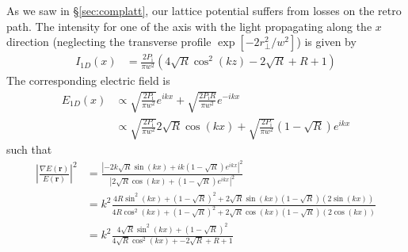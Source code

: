\documentclass[11pt,letter]{article}
\newcommand{\bv}[1]{\ensuremath{\bm{#1}}}
\begin{document}
\vspace{1em} As we saw in \S\ref{sec:complatt}, our lattice potential suffers
from losses on the retro path.  The intensity for one of the axis with the
light propagating along the $x$ direction (neglecting the transverse profile
$\exp[-2r_{\perp}^{2}/w^{2}]$) is given by 
\begin{equation}
\begin{split}
 I_{1D}(x) 
   & = 
\frac{2 P_{\text{i}}}{\pi w^{2}} 
  \left( 4\sqrt{R}\cos^{2}(kz) - 2\sqrt{R} +R+1\right)
\end{split}
\label{eq:I1D} 
\end{equation}
The corresponding electric field is 
\begin{equation}
\begin{split}
 E_{1D}(x) & \propto  \sqrt{\frac{2P_{\text{i}} }{\pi w^{2}}}
  e^{ikx} + \sqrt{ \frac{2P_{\text{i}}R }{ \pi w^{2} } } e^{-ikx}  \\
   & \propto 
    \sqrt{\frac{2P_{\text{i}} }{\pi w^{2}}} 2\sqrt{R}  \cos(kx) + 
    \sqrt{\frac{2P_{\text{i}} }{\pi w^{2}}} (1-\sqrt{R})e^{ikx}
\end{split} 
\end{equation}
such that
\begin{equation}
\begin{split} 
    \left| 
   \frac{ \nabla E(\bv{r}) }
        {  E(\bv{r})} 
    \right|^{2} &  =  \frac{  \left|   
    -2k\sqrt{R} \sin(kx) +  ik(1-\sqrt{R}) e^{ikx}   \right|^{2} }
    { \left| 2\sqrt{R} \cos(kx) + (1-\sqrt{R})e^{ikx} \right|^{2}}   \\ 
   &  = k^{2}
    \frac{   4R\sin^{2}(kx) + (1-\sqrt{R})^{2} +  
            2\sqrt{R}\sin(kx) (1-\sqrt{R})( 2\sin(kx) )  }
    {  4R\cos^{2}(kx)  +  (1-\sqrt{R})^{2} +
            2\sqrt{R}\cos(kx)(1-\sqrt{R}) ( 2\cos(kx) )  } \\
   &  = k^{2}
    \frac{   4\sqrt{R}\sin^{2}(kx) + (1-\sqrt{R})^{2} 
             }
    {  4\sqrt{R}\cos^{2}(kx)  +  - 2\sqrt{R} + R + 1   
             }
\end{split} 
\end{equation}
\end{document}
